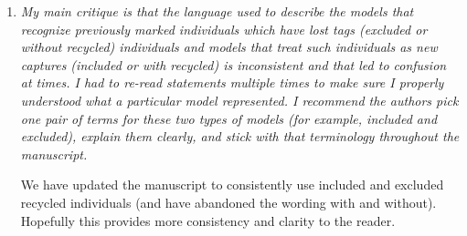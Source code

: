 \documentclass[12pt]{article}
\begin{document}
\begin{enumerate}
\item  {\it My main critique is that the language used to describe the models that recognize previously marked individuals which have lost tags (excluded or without recycled) individuals and models that treat such individuals as new captures (included or with recycled) is inconsistent and that led to confusion at times. I had to re-read statements multiple times to make sure I properly understood what a particular model represented. I recommend the authors pick one pair of terms for these two types of models (for example, included and excluded), explain them clearly, and stick with that terminology throughout the manuscript.}

We have updated the manuscript to consistently use included and excluded recycled individuals (and have abandoned the wording with and without). Hopefully this provides more consistency and clarity to the reader.
\end{enumerate}


\bigskip
\end{document}
